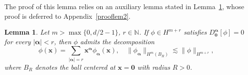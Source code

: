 \documentclass{sn-jnl}%
\numberwithin{equation}{section}
\theoremstyle{thmstyleone}%
\newtheorem{lemma}{Lemma}[section]%
\theoremstyle{thmstyletwo}%
\theoremstyle{thmstylethree}%
\begin{document}
The proof of this lemma relies on an auxiliary lemma stated in Lemma~\ref{Lem6.3}, whose proof is deferred to Appendix~\ref{prooflem2}.


\begin{lemma}\label{Lem6.3}
    Let $m> \max\{0,d/2-1\}$, $r \in \mathbb{N}$. If $\phi \in H^{m+r}$ satisfies ${D}^{\bm \alpha}_{\bm 0}[\phi] = 0$ for every $|\bm \alpha| <r$, then $\phi$ admits the decomposition
    \begin{equation}\label{eq-Lem6.3-01}
        \phi(\bm x) = \sum_{|\bm \alpha|=r}\bm x^{\bm \alpha}\phi_{\bm \alpha}(\bm x),\quad \|\phi_{\bm \alpha}\|_{H^{m}(B_R)}\lesssim \|\phi\|_{H^{m+r}},
    \end{equation}
    where $B_R$ denotes the ball centered at $\bm x=\bm 0$ with radius $R>0$.
\end{lemma}
\end{document}
